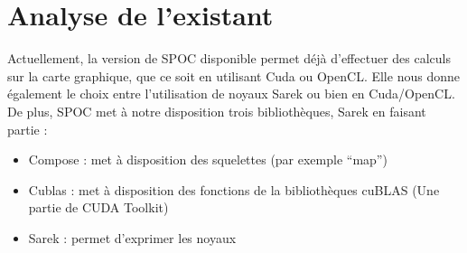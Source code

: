 \documentclass{report}
\begin{document}
\section{Analyse de l'existant}
Actuellement, la version de SPOC disponible permet déjà d’effectuer des calculs sur la carte graphique, que ce soit en utilisant Cuda ou OpenCL. Elle nous donne également le choix entre l’utilisation de noyaux Sarek ou bien en Cuda/OpenCL. De plus, SPOC met à notre disposition trois bibliothèques, Sarek en faisant partie : 

\begin{itemize}

\item Compose : met à disposition des squelettes (par exemple “map”)
\item Cublas : met à disposition des fonctions de la bibliothèques cuBLAS (Une partie de CUDA Toolkit)
\item Sarek : permet d’exprimer les noyaux

\end{itemize}



\end{document}
